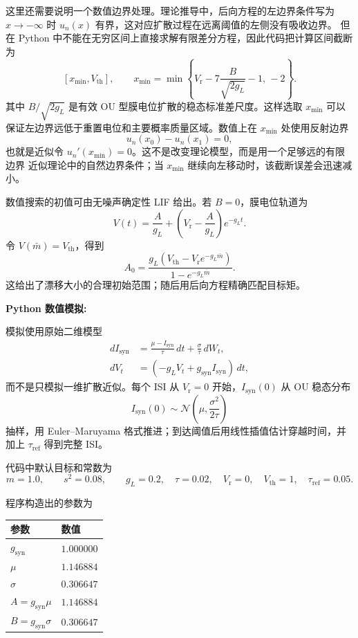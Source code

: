 \documentclass[UTF8]{ctexart}
\begin{document}
这里还需要说明一个数值边界处理。理论推导中，后向方程的左边界条件写为
$x\to-\infty$ 时 $u_n(x)$ 有界，这对应扩散过程在远离阈值的左侧没有吸收边界。
但在 Python 中不能在无穷区间上直接求解有限差分方程，因此代码把计算区间截断为
\[
[x_{\min},V_{\mathrm{th}}],
\qquad
x_{\min}
=\min\left\{
V_{\mathrm r}-7\frac{B}{\sqrt{2g_L}}-1,\,-2
\right\}.
\]
其中 $B/\sqrt{2g_L}$ 是有效 OU 型膜电位扩散的稳态标准差尺度。这样选取
$x_{\min}$ 可以保证左边界远低于重置电位和主要概率质量区域。数值上在
$x_{\min}$ 处使用反射边界
\[
u_n(x_0)-u_n(x_1)=0,
\]
也就是近似令 $u_n'(x_{\min})=0$。这不是改变理论模型，而是用一个足够远的有限边界
近似理论中的自然边界条件；当 $x_{\min}$ 继续向左移动时，该截断误差会迅速减小。

数值搜索的初值可由无噪声确定性 LIF 给出。若 $B=0$，膜电位轨道为
\[
V(t)=\frac{A}{g_L}+\left(V_{\mathrm r}-\frac{A}{g_L}\right)e^{-g_Lt}.
\]
令 $V(\bar m)=V_{\mathrm{th}}$，得到
\[
A_0=
\frac{g_L\left(V_{\mathrm{th}}-V_{\mathrm r}e^{-g_L\bar m}\right)}
{1-e^{-g_L\bar m}}.
\]
这给出了漂移大小的合理初始范围；随后用后向方程精确匹配目标矩。

\textbf{Python 数值模拟:}

模拟使用原始二维模型
\begin{align*}
	dI_{\mathrm{syn}}
	&=\frac{\mu-I_{\mathrm{syn}}}{\tau}\,dt+\frac{\sigma}{\tau}\,dW_t,\\
	dV_t&=(-g_LV_t+g_{\mathrm{syn}}I_{\mathrm{syn}})\,dt,
\end{align*}
而不是只模拟一维扩散近似。每个 ISI 从 $V_{\mathrm r}=0$ 开始，$I_{\mathrm{syn}}(0)$
从 OU 稳态分布
\[
I_{\mathrm{syn}}(0)\sim \mathcal N\left(\mu,\frac{\sigma^2}{2\tau}\right)
\]
抽样，用 Euler--Maruyama 格式推进；到达阈值后用线性插值估计穿越时间，并加上
$\tau_{\mathrm{ref}}$ 得到完整 ISI。

代码中默认目标和常数为
\[
m=1.0,\qquad s^2=0.08,\qquad
g_L=0.2,\quad \tau=0.02,\quad
V_{\mathrm r}=0,\quad V_{\mathrm{th}}=1,\quad \tau_{\mathrm{ref}}=0.05.
\]


程序构造出的参数为
\begin{center}
	\begin{tabular}{ll}
		\toprule
		参数 & 数值 \\
		\midrule
		$g_{\mathrm{syn}}$ & $1.000000$ \\
		$\mu$ & $1.146884$ \\
		$\sigma$ & $0.306647$ \\
		$A=g_{\mathrm{syn}}\mu$ & $1.146884$ \\
		$B=g_{\mathrm{syn}}\sigma$ & $0.306647$ \\
		\bottomrule
	\end{tabular}
\end{center}
\end{document}
